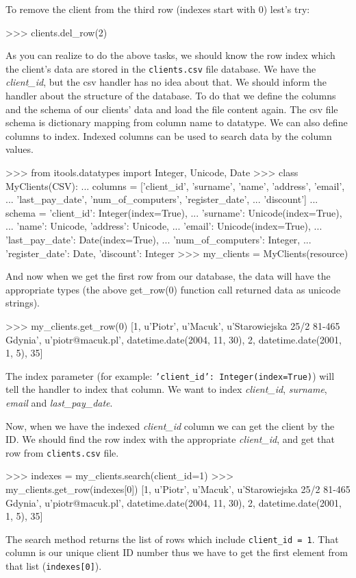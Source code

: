 \documentclass[a4paper]{book}
\begin{document}
To remove the client from the third row (indexes start with 0) lest's try:
\begin{code}
    >>> clients.del_row(2)
\end{code}
As you can realize to do the above tasks, we should know the row index 
which the client's data are stored in the {\tt clients.csv} file database. 
We have the {\em client\_id}, but the csv handler has no idea about that. 
We should inform the handler about the structure of the database. To do that 
we define the columns and the schema of our clients' data and load the file 
content again. The csv file schema is dictionary mapping from column name to
datatype. We can also define columns to index. Indexed columns can be used
to search data by the column values.
\begin{code}
    >>> from itools.datatypes import Integer, Unicode, Date
    >>> class MyClients(CSV):
    ...     columns = ['client_id', 'surname', 'name', 'address', 'email',
    ...                'last_pay_date', 'num_of_computers', 'register_date',
    ...                'discount']
    ...     schema = {'client_id': Integer(index=True), 
    ...               'surname': Unicode(index=True),
    ...               'name': Unicode, 'address': Unicode, 
    ...               'email': Unicode(index=True),
    ...               'last_pay_date': Date(index=True), 
    ...               'num_of_computers': Integer,
    ...               'register_date': Date, 'discount': Integer}
    >>> my_clients = MyClients(resource)
\end{code}

And now when we get the first row from our database, the data will have the 
appropriate types (the above get\_row(0) function call returned data as unicode 
strings).
\begin{code}
    >>> my_clients.get_row(0)
    [1, u'Piotr', u'Macuk', u'Starowiejska 25/2 81-465 Gdynia',
    u'piotr@macuk.pl', datetime.date(2004, 11, 30), 2, 
    datetime.date(2001, 1, 5), 35] 
\end{code}

The index parameter (for example: {\tt 'client\_id': Integer(index=True)})
will  tell the handler to index that column. We want to index {\em client\_id},
{\em surname}, {\em email} and {\em last\_pay\_date}.

Now, when we have the indexed {\em client\_id} column we can get the client
by the ID. We should find the row index with the appropriate {\em client\_id},
and get that row from {\tt clients.csv} file.
\begin{code}
    >>> indexes = my_clients.search(client_id=1)
    >>> my_clients.get_row(indexes[0])
    [1, u'Piotr', u'Macuk', u'Starowiejska 25/2 81-465 Gdynia', 
    u'piotr@macuk.pl', datetime.date(2004, 11, 30), 2, 
    datetime.date(2001, 1, 5), 35]
\end{code}
The search method returns the list of rows which include {\tt client\_id = 1}.
That column is our unique client ID number thus we have to get the first
element from that list ({\tt indexes[0]}).
\end{document}
